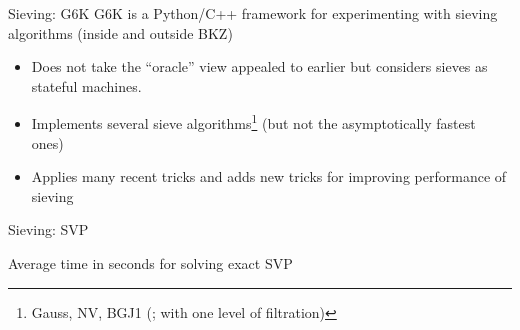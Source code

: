\documentclass[xcolor=table,10pt,aspectratio=169]{beamer}
\begin{document}
\begin{frame}[label={sec:org35814b5}]{Sieving: G6K}
G6K  is a Python/C++ framework for experimenting with sieving algorithms (inside and outside BKZ)
\begin{itemize}
\item Does not take the “oracle” view appealed to earlier but considers sieves as stateful machines.
\item Implements several sieve algorithms\footnote{Gauss, NV, BGJ1 (; with one level of filtration)} (but not the asymptotically fastest   ones)
\item Applies many recent tricks and adds new tricks for improving performance of sieving
\end{itemize}
\end{frame}

\begin{frame}[label={sec:orga91a887}]{Sieving: SVP}
\begin{center}
Average time in seconds for solving exact SVP
\end{center}
\end{frame}
\end{document}

